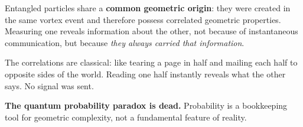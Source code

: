 Entangled particles share a \textbf{common geometric origin}: they were created in the same vortex event and therefore possess correlated geometric properties. Measuring one reveals information about the other, not because of instantaneous communication, but because \emph{they always carried that information}.

The correlations are classical: like tearing a page in half and mailing each half to opposite sides of the world. Reading one half instantly reveals what the other says. No signal was sent.

\textbf{The quantum probability paradox is dead.} Probability is a bookkeeping tool for geometric complexity, not a fundamental feature of reality.
